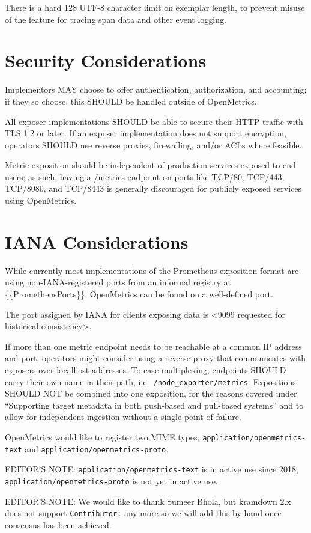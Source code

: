 \documentclass[a4paper,12pt,notitlepage,twoside,openright]{article}
\begin{document}
There is a hard 128 UTF-8 character limit on exemplar length, to prevent
misuse of the feature for tracing span data and other event logging.

\hypertarget{IANA}{%
\section{Security Considerations}\label{IANA}}

Implementors MAY choose to offer authentication, authorization, and
accounting; if they so choose, this SHOULD be handled outside of
OpenMetrics.

All exposer implementations SHOULD be able to secure their HTTP traffic
with TLS 1.2 or later. If an exposer implementation does not support
encryption, operators SHOULD use reverse proxies, firewalling, and/or
ACLs where feasible.

Metric exposition should be independent of production services exposed
to end users; as such, having a /metrics endpoint on ports like TCP/80,
TCP/443, TCP/8080, and TCP/8443 is generally discouraged for publicly
exposed services using OpenMetrics.

\hypertarget{Security}{%
\section{IANA Considerations}\label{Security}}

While currently most implementations of the Prometheus exposition format
are using non-IANA-registered ports from an informal registry at
\{\{PrometheusPorts\}\}, OpenMetrics can be found on a well-defined
port.

The port assigned by IANA for clients exposing data is \textless9099
requested for historical consistency\textgreater.

If more than one metric endpoint needs to be reachable at a common IP
address and port, operators might consider using a reverse proxy that
communicates with exposers over localhost addresses. To ease
multiplexing, endpoints SHOULD carry their own name in their path,
i.e.~\texttt{/node\_exporter/metrics}. Expositions SHOULD NOT be
combined into one exposition, for the reasons covered under ``Supporting
target metadata in both push-based and pull-based systems'' and to allow
for independent ingestion without a single point of failure.

OpenMetrics would like to register two MIME types,
\texttt{application/openmetrics-text} and
\texttt{application/openmetrics-proto}.

EDITOR'S NOTE: \texttt{application/openmetrics-text} is in active use
since 2018, \texttt{application/openmetrics-proto} is not yet in active
use.

EDITOR'S NOTE: We would like to thank Sumeer Bhola, but kramdown 2.x
does not support \texttt{Contributor:} any more so we will add this by
hand once consensus has been achieved.
\end{document}
